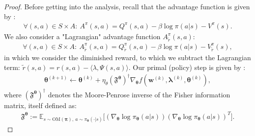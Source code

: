 \begin{proof}
    
Before getting into the analysis, recall that the advantage function is given by : 
\begin{align*}
    \forall (s,a) \in S \times A : ~ A^\pi(s,a) = Q^\pi(s,a) - \beta \log \pi(a|s) - V^\pi(s).
\end{align*}
We also consider a "Lagrangian" advantage function $A^\pi_{\tilde{r}}(s,a)$:
\begin{align}
    \label{eq:adv_function}
    \forall (s,a) \in S \times A : ~ A_{\tilde{r}}^\pi(s,a) = Q_{\tilde{r}}^\pi(s,a) - \beta \log \pi(a|s) - V_{\tilde{r}}^\pi(s),
\end{align}
in which we consider the diminished reward, to which we subtract the Lagrangian term: $\tilde{r}(s,a) = r(s,a) - \langle \lambda, \Psi(s,a) \rangle$.
Our primal (policy) step is given by : 
\begin{align*}
    \bm{\theta}^{(k+1)} 
    \leftarrow  \bm{\theta}^{(k)} 
    + \eta_\theta 
    (\mathfrak{F}^{\bm{\theta}})^\dagger
    \nabla_{\bm{\theta}} 
    f(\bm{w}^{(k)},\bm{\lambda}^{(k)},\bm{\theta}^{(k)}),\tag{S}
\end{align*}
where $(\mathfrak{F}^{\bm{\theta}})^\dagger$ denotes the Moore-Penrose inverse of the Fisher information matrix, itself defined as:
\begin{align*}
    \mathfrak{F}^{\bm{\theta}}
    := \mathbb{E}_{
        s \sim \text{OM}(\bm{\pi}), ~
        a \sim \pi_{\bm{\theta}}(\cdot|s)
    }\Big[
        (\nabla_{\bm{\theta}} \log \pi_{\bm{\theta}} (a|s))
        (\nabla_{\bm{\theta}} \log \pi_{\bm{\theta}} (a|s))^T
    \Big].
\end{align*}


\end{proof}
